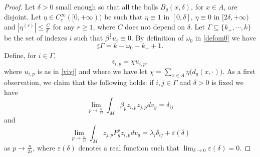 \documentclass[10pt]{amsart}
\numberwithin{equation}{section}
\def\de{{\delta}}
\newcommand{\ve}{\varepsilon}
\theoremstyle{plain}
\theoremstyle{remark}
\begin{document}
\begin{proof}
Let $\delta >0$ small enough so that all the balls $B_g(x,\delta)$, for $x \in A$, are disjoint. Let $\eta \in C^\infty_c([0, + \infty))$ be such that $\eta \equiv 1$ in $[0, \delta]$, $\eta \equiv 0$ in $[2\delta, + \infty)$ and $|\eta^{(r)}| \leq \frac{C}{\de^r}$ for any $r \ge 1$, where $C$ does not depend on $\de$. Let $\Gamma \subseteq \{k_+, \cdots, k \}$ be the set of indexes $i$ such that $\beta^{\frac{1}{2}} u_i \equiv 0$. By definition of $\omega_0$ in \eqref{defom0} we have 
\begin{equation} \label{indicesgamma}
 \sharp \Gamma= k-\omega_0 -k_++1.
\end{equation}
Define, for $i \in \Gamma$, 
\begin{equation} \label{defzip}
z_{i,p}= \chi u_{i,p}, 
\end{equation}
where $u_{i,p}$ is as in \eqref{vivj} and where we have let $\chi =  \sum_{x \in A} \eta \big( d_g(x, \cdot) \big) $. As a first observation, we claim that the following holds: 
if $i,j \in \Gamma$ and $\delta >0$ is fixed we have %
\begin{equation} \label{step11}
\lim_{p \to \frac{n}{2s}} \int_M \beta_p z_{i,p} z_{j,p} dv_g = \delta_{ij}
\end{equation}
and 
\begin{equation} \label{step12}
\lim_{p \to \frac{n}{2s}}\int_M  z_{j,p} P_g^sz_{i,p} dv_g =\lambda_i \delta_{ij}   + \ve(\delta)
\end{equation}
as $p \to \frac{n}{2s}$, where $\ve(\delta)$ denotes a real function such that $\lim_{\delta \to 0} \ve(\delta) = 0$.   


\end{proof}
\end{document}
